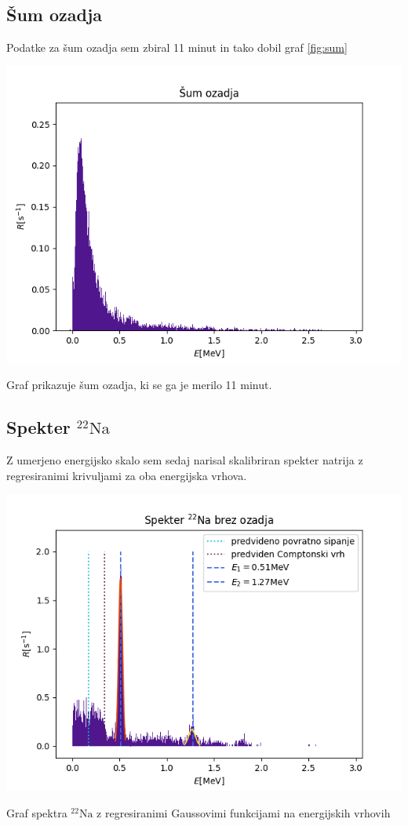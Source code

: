 \documentclass[11pt]{article}
\begin{document}
\subsection{Šum ozadja}\label{sec:org39e42a5}

Podatke za šum ozadja sem zbiral 11 minut in tako dobil graf \ref{fig:sum}

\begin{slika}[H]
\begin{center}
\includegraphics[width=.9\linewidth]{figures/ozadje.png}
\caption{\small Graf prikazuje šum ozadja, ki se ga je merilo 11 minut. }\label{fig:sum}
\end{center}
\end{slika}

\subsection{Spekter \(^{22} \mathrm{Na}\)}\label{sec:org0586687}

Z umerjeno energijsko skalo sem sedaj narisal skalibriran spekter natrija z regresiranimi krivuljami za oba energijska vrhova.

\begin{slika}[H]
\begin{center}
\includegraphics[width=.9\linewidth]{figures/na22_no_bg.png}
\caption{\small Graf spektra $^{22} \mathrm{Na}$ z regresiranimi Gaussovimi funkcijami na energijskih vrhovih}
\end{center}
\end{slika}
\end{document}

